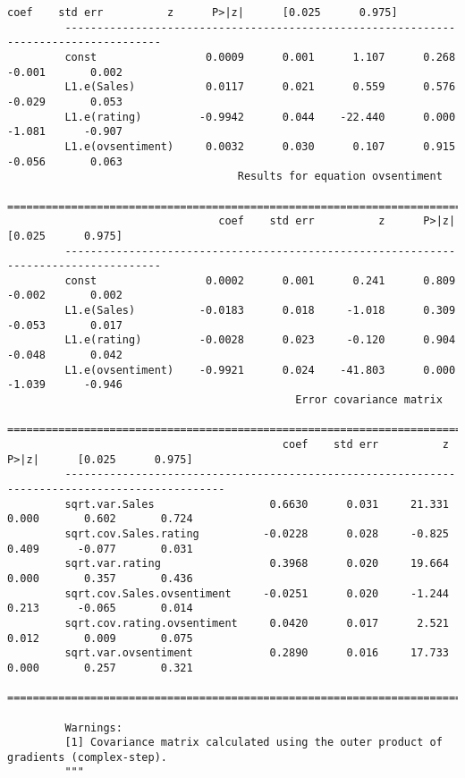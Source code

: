 \documentclass[11pt]{article}
\begin{document}
\begin{Verbatim}[commandchars=\\\{\}]
                                 coef    std err          z      P>|z|      [0.025      0.975]
         -------------------------------------------------------------------------------------
         const                 0.0009      0.001      1.107      0.268      -0.001       0.002
         L1.e(Sales)           0.0117      0.021      0.559      0.576      -0.029       0.053
         L1.e(rating)         -0.9942      0.044    -22.440      0.000      -1.081      -0.907
         L1.e(ovsentiment)     0.0032      0.030      0.107      0.915      -0.056       0.063
                                    Results for equation ovsentiment                          
         =====================================================================================
                                 coef    std err          z      P>|z|      [0.025      0.975]
         -------------------------------------------------------------------------------------
         const                 0.0002      0.001      0.241      0.809      -0.002       0.002
         L1.e(Sales)          -0.0183      0.018     -1.018      0.309      -0.053       0.017
         L1.e(rating)         -0.0028      0.023     -0.120      0.904      -0.048       0.042
         L1.e(ovsentiment)    -0.9921      0.024    -41.803      0.000      -1.039      -0.946
                                             Error covariance matrix                                    
         ===============================================================================================
                                           coef    std err          z      P>|z|      [0.025      0.975]
         -----------------------------------------------------------------------------------------------
         sqrt.var.Sales                  0.6630      0.031     21.331      0.000       0.602       0.724
         sqrt.cov.Sales.rating          -0.0228      0.028     -0.825      0.409      -0.077       0.031
         sqrt.var.rating                 0.3968      0.020     19.664      0.000       0.357       0.436
         sqrt.cov.Sales.ovsentiment     -0.0251      0.020     -1.244      0.213      -0.065       0.014
         sqrt.cov.rating.ovsentiment     0.0420      0.017      2.521      0.012       0.009       0.075
         sqrt.var.ovsentiment            0.2890      0.016     17.733      0.000       0.257       0.321
         ===============================================================================================
         
         Warnings:
         [1] Covariance matrix calculated using the outer product of gradients (complex-step).
         """
\end{Verbatim}
            
\end{document}

